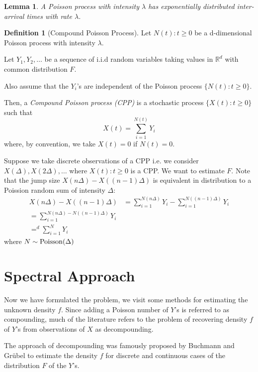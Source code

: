\documentclass[a4paper,11pt]{article}
\theoremstyle{theorem}
\newtheorem{lem}{Lemma}[section]
\theoremstyle{definition}
\newtheorem{defn}{Definition}[section]
\begin{document}
\begin{lem}
A Poisson process with intensity $\lambda$ has exponentially distributed inter-arrival times with rate $\lambda$.  
\end{lem}

\begin{defn}[Compound Poisson Process] Let ${N(t) : t \geq 0}$ be a d-dimensional Poisson process with intensity $\lambda$. 

Let $Y_{1}, Y_{2}, \dotsc$ be a sequence of i.i.d random variables taking values in $\mathbb{R}^{d}$ with common distribution $F$.

Also assume that the $Y_{i}$'s are independent of the Poisson process $\{N(t) : t \geq 0 \}$.

Then, a \textit{Compound Poisson process (CPP)} is a stochastic process $\{ X(t) : t \geq 0 \}$ such that
\[
X(t) = \sum_{i=1}^{N(t)} Y_{i}
\]
where, by convention, we take $X(t) = 0$ if $N(t) = 0$.

\end{defn}

Suppose we take discrete observations of a CPP i.e. we consider $X(\Delta), X(2\Delta), \dotsc$ where ${X(t) : t \geq 0}$ is a CPP. We want to estimate $F$. Note that the jump size $X(n\Delta) - X((n-1)\Delta)$ is equivalent in distribution to a Poission random sum of intensity $\Delta$:
\begin{align*}
X(n\Delta) - X((n-1)\Delta) &= \sum_{i=1}^{N(n\Delta)}{Y_{i}} - \sum_{i=1}^{N((n-1)\Delta)}{Y_{i}} \\
= \sum_{i=1}^{N(n\Delta) - N((n-1)\Delta)}{Y_{i}} \\
=^{d} \sum_{i=1}^{N}{Y_{i}}
\end{align*}
where $N \sim {\rm Poisson}{(\Delta)}$

\section{Spectral Approach}

Now we have formulated the problem, we visit some methods for estimating the unknown density $f$. Since adding a Poisson number of $Y$'s is referred to as compounding, much of the literature refers to the problem of recovering density $f$ of $Y$'s from observations of $X$ as decompounding.

The approach of decompounding was famously proposed by Buchmann and Gr\"{u}bel to estimate the density $f$ for discrete and continuous cases of the distribution $F$ of the $Y$'s.
\end{document}
